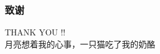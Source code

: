 \begin{frame}
\frametitle{致谢}
\begin{center}
{\Huge THANK YOU !!}\\[1em]
{\Large 月亮想着我的心事，一只猫吃了我的奶酪}
\end{center}
\end{frame}